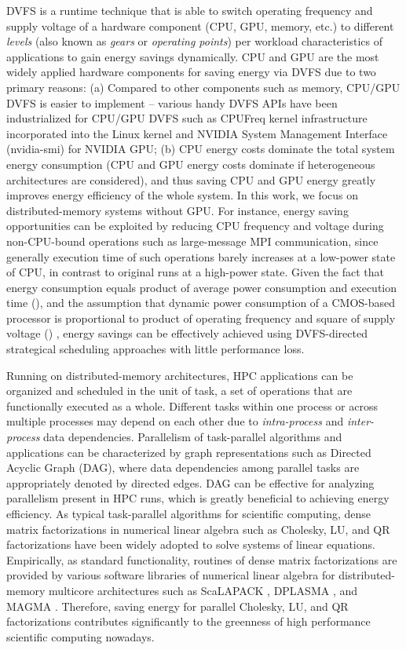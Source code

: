 \documentclass[12pt]{elsarticle}
\begin{document}
DVFS is a runtime technique that is able to switch operating frequency and supply voltage of a hardware component (CPU, GPU, memory, etc.) to different \emph{levels} (also known as \emph{gears} or \emph{operating points}) per workload characteristics of applications to gain energy savings dynamically. CPU and GPU are the most widely applied hardware components for saving energy via DVFS due to two primary reasons: (a) Compared to other components such as memory, CPU/GPU DVFS is easier to implement \cite{icac11} -- various handy DVFS APIs have been industrialized for CPU/GPU DVFS such as CPUFreq kernel infrastructure \cite{cpufreq} incorporated into the Linux kernel and NVIDIA System Management Interface (nvidia-smi) \cite{smi} for NVIDIA GPU; (b) CPU energy costs dominate the total system energy consumption \cite{tpds10} (CPU and GPU energy costs dominate if heterogeneous architectures are considered), and thus saving CPU and GPU energy greatly improves energy efficiency of the whole system. In this work, we focus on distributed-memory systems without GPU. For instance, energy saving opportunities can be exploited by reducing CPU frequency and voltage during non-CPU-bound operations such as large-message MPI communication, since generally execution time of such operations barely increases at a low-power state of CPU, in contrast to original runs at a high-power state. Given the fact that energy consumption equals product of average power consumption and execution time (), and the assumption that dynamic power consumption of a CMOS-based processor is proportional to product of operating frequency and square of supply voltage () \cite{ics02} \cite{sc05c}, energy savings can be effectively achieved using DVFS-directed strategical scheduling approaches with little performance loss.

Running on distributed-memory architectures, HPC applications can be organized and scheduled in the unit of task, a set of operations that are functionally executed as a whole. Different tasks within one process or across multiple processes may depend on each other due to \emph{intra-process} and \emph{inter-process} data dependencies. Parallelism of task-parallel algorithms and applications can be characterized by graph representations such as Directed Acyclic Graph (DAG), where data dependencies among parallel tasks are appropriately denoted by directed edges. DAG can be effective for analyzing parallelism present in HPC runs, which is greatly beneficial to achieving energy efficiency. As typical task-parallel algorithms for scientific computing, dense matrix factorizations in numerical linear algebra such as Cholesky, LU, and QR factorizations have been widely adopted to solve systems of linear equations. Empirically, as standard functionality, routines of dense matrix factorizations are provided by various software libraries of numerical linear algebra for distributed-memory multicore architectures such as ScaLAPACK \cite{scalapack}, DPLASMA \cite{dplasma}, and MAGMA \cite{magma}. Therefore, saving energy for parallel Cholesky, LU, and QR factorizations contributes significantly to the greenness of high performance scientific computing nowadays.
\end{document}
